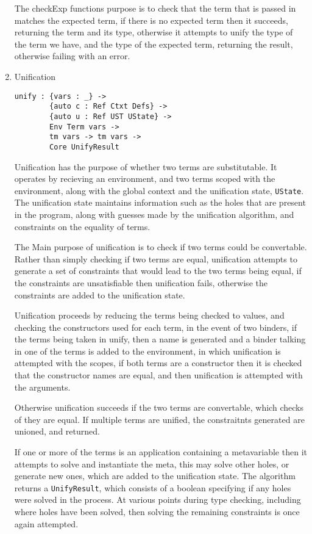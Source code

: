 \documentclass[a4paper]{article}
\begin{document}
\begin{enumerate}
The checkExp functions purpose is to check that the term that is passed
in matches the expected term, if there is no expected term then it 
succeeds, returning the term and its type, otherwise it attempts to 
unify the type of the term we have, and the type of the expected term, 
returning the result, otherwise failing with an error. 

\item Unification
\label{sec:org292bf4c}

\begin{center}
\begin{verbatim}
unify : {vars : _} ->
		{auto c : Ref Ctxt Defs} ->
		{auto u : Ref UST UState} ->
		Env Term vars ->
		tm vars -> tm vars ->
		Core UnifyResult
\end{verbatim}
\end{center}
Unification has the purpose of whether two terms are substitutable. 
It operates by recieving an environment, and two terms scoped 
with the environment, along with the global context and the unification
state, \texttt{UState}. The unification state maintains information such as 
the holes that are present in the program, along with guesses made by 
the unification algorithm, and constraints on the equality of terms.

The Main purpose of unification is to check if two terms could be 
convertable. Rather than simply checking if two terms are equal, 
unification attempts to generate a set of constraints that would lead 
to the two terms being equal, if the constraints are unsatisfiable then
unification fails, otherwise the constraints are added to the
unification state. 

Unification proceeds by reducing the terms being checked to values, and
checking the constructors used for each term, in the event of two binders, 
if the terms being taken in unify, then a name is generated and a 
binder talking in one of the terms is added to the environment, in which
unification is attempted with the scopes, if both terms are a constructor
then it is checked that the constructor names are equal, and then unification
is attempted with the arguments. 

Otherwise unification succeeds if the two terms are convertable, which
checks of they are equal. If multiple terms are unified, the constraitnts 
generated are unioned, and returned.  

If one or more of the terms is an application containing a metavariable
then it attempts to solve and instantiate the meta, this may solve other 
holes, or generate new ones, which are added to the unification state. 
The algorithm returns a \texttt{UnifyResult}, which consists of a boolean 
specifying if any holes were solved in the process. At various points 
during type checking, including where holes have been solved, then 
solving the remaining constraints is once again attempted. 


\end{enumerate}
\end{document}
